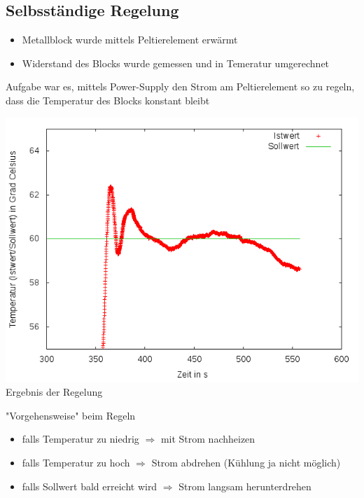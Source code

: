 \documentclass[compress,11pt]{beamer}
\begin{document}
\begin{frame}


\section{Selbsständige Regelung}
\begin{itemize}
\item Metallblock wurde mittels Peltierelement erwärmt
\item Widerstand des Blocks wurde gemessen und in Temeratur umgerechnet
\end{itemize}
Aufgabe war es, mittels Power-Supply den Strom am Peltierelement so zu regeln, dass die Temperatur des Blocks konstant bleibt
\end{frame}
\begin{frame}
\textsc{\includegraphics[width=.7\textwidth]{../2aufgabe/2a_T_genauer}\\}
Ergebnis der Regelung
\end{frame}
\begin{frame}
\begin{block}{"Vorgehensweise" beim Regeln}
\begin{itemize}
\item falls Temperatur zu niedrig $\Rightarrow$ mit Strom nachheizen
\item falls Temperatur zu hoch $\Rightarrow$ Strom abdrehen (Kühlung ja nicht möglich)
\item falls Sollwert bald erreicht wird $\Rightarrow$ Strom langsam herunterdrehen
\end{itemize}
\end{block}
\end{frame}
\end{document}

